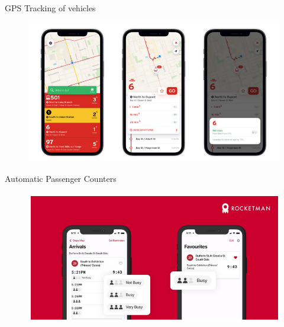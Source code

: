 \documentclass[aspectratio=169]{beamer}
\begin{document}
\begin{frame}
	
	GPS Tracking of vehicles
	
	\begin{figure}
		\centering
		\includegraphics[width=0.7\linewidth]{images/transit_app}
	\end{figure}
	
\end{frame}


\begin{frame}
	
 	Automatic Passenger Counters
	
	\begin{figure}
		\centering
		\includegraphics[width=0.7\linewidth]{images/rocketman}
	\end{figure}
	
\end{frame}


\end{document}
